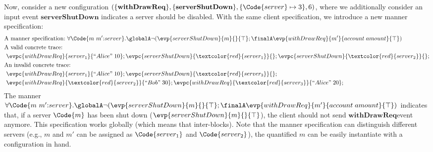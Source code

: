 \begin{example}
Now, consider a new configuration $(\{\mathbf{withDrawReq}\}, \{\mathbf{serverShutDown}\}, \{\Code{server}\mapsto3\}, 6)$, where we additionally consider an input event $\mathbf{serverShutDown}$ indicates a server should be disabled. With the same client specification, we introduce a new manner specification:
{\small
\begin{align*}
    &\text{A manner specification:}\ \forall \Code{m\ m'{:}server}.\globalA \neg (\evp{serverShutDown}{m}{}{\top};\finalA \evp{withDrawReq}{m'}{account\; amount}{\top})
    \\&\text{A valid concrete trace:}\ 
    \\ &\ \evpc{withDrawReq}{server_1}{``Alice"\; 10};\evpc{serverShutDown}{\textcolor{red}{server_1}}{};\evpc{serverShutDown}{\textcolor{red}{server_2}}{};
    \\&\text{An invalid concrete trace:}\ 
    \\ &\ \evpc{withDrawReq}{server_1}{``Alice"\; 10};\evpc{serverShutDown}{\textcolor{red}{server_3}}{};
    \\ &\ \evpc{withDrawReq}{\textcolor{red}{server_2}}{``Bob"\; 30};\evpc{withDrawReq}{\textcolor{red}{server_3}}{``Alice"\; 20};
\end{align*}}\noindent
The manner $\forall \Code{m\ m'{:}server}.\globalA \neg (\evp{serverShutDown}{m}{}{\top};\finalA \evp{withDrawReq}{m'}{account\; amount}{\top})$ indicates that, if a server $\Code{m}$ has been shut down ($\evp{serverShutDown}{m}{}{\top}$), the client should not send $\mathbf{withDrawReq} $event anymore. This specification works globally (which means that inter-blocks). Note that the manner specification can distinguish different servers (e.g., $m$ and $m'$ can be assigned as $\Code{server_1}$ and $\Code{server_2}$), the quantified $m$ can be easily instantiate with a configuration in hand.
\end{example}
